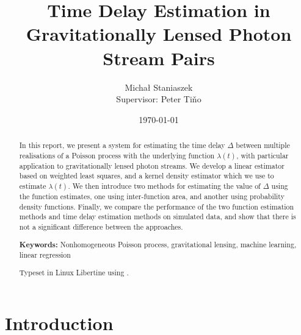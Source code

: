 \documentclass[a4paper,11pt]{article}
\title{Time Delay Estimation in Gravitationally Lensed Photon Stream Pairs}
\author{\Large{Micha{\l} Staniaszek} \\\small{Supervisor: Peter Ti{\v{n}}o}}
\date{\today}
\begin{document}
\maketitle


\thispagestyle{empty}
\newpage
{}
\begin{abstract}
In this report, we present a system for estimating the time delay $\Delta$
between multiple realisations of a Poisson process with the underlying function
$\lambda(t)$, with particular application to gravitationally lensed photon
streams. We develop a linear estimator based on weighted least squares, and a
kernel density estimator which we use to estimate $\lambda(t)$. We then
introduce two methods for estimating the value of $\Delta$ using the function
estimates, one using inter-function area, and another using probability density
functions. Finally, we compare the performance of the two function estimation
methods and time delay estimation methods on simulated data, and show that there
is not a significant difference between the approaches.

\vspace{1.0cm}\noindent\textbf{Keywords:} Nonhomogeneous Poisson process, gravitational lensing,
 machine learning, linear regression

\begin{center}
\vspace*{\fill}\scriptsize{Typeset in Linux Libertine using \XeLaTeX}.
\end{center}
\end{abstract}
\newpage
\tableofcontents
\newpage
{}
\section{Introduction}
\label{sec-1}
\end{document}
